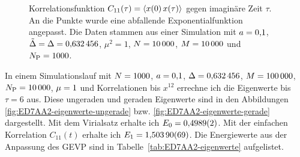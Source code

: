 \begin{figure}[htbp]
    \centering
    \caption{%
        Korrelationsfunktion $C_{11}(\tau) = \langle x(0) \, x(\tau) \rangle$ gegen
        imaginäre Zeit $\tau$. An die Punkte wurde eine abfallende
        Exponentialfunktion angepasst. Die Daten stammen aus einer Simulation
        mit $a = \num{0.1}$, $\tilde \Delta = \Delta =
        \num{0.632456}$, $\mu^2 = \num{1}$, $N = \num{10000}$,
        $M = \num{10000}$ und $N_\text P = \num{1000}$.
    }
    \label{fig:84DAA2-correlation}
\end{figure}


In einem Simulationslauf mit $N = \num{1000}$, $a =
\num{0.1}$, $\Delta = \num{0.632456}$, $M = \num{100000}$,
$N_\text P = \num{10000}$, $\mu = \num{1}$ und Korrelationen bis
$x^{12}$ errechne ich die Eigenwerte bis $\tau = \num{6}$ aus. Diese ungeraden
und geraden Eigenwerte sind in den Abbildungen
\ref{fig:ED7AA2-eigenwerte-ungerade} bzw. \ref{fig:ED7AA2-eigenwerte-gerade}
dargestellt. Mit dem Virialsatz erhalte ich $E_0 = \num{0.4989 +- 0.0002}$. Mit
der einfachen Korrelation $C_{11}(t)$ erhalte ich $E_1 = \num{1.50390 +- 0.00069}$. Die Energiewerte aus der Anpassung des GEVP sind in
Tabelle~\ref{tab:ED7AA2-eigenwerte} aufgelistet.

